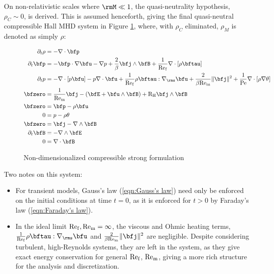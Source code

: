     On non-relativistic scales where $\rmM  \ll  1$, the quasi-neutrality hypothesis, $\rho_{C}  \sim  0$, is derived. This is assumed henceforth, giving the final quasi-neutral compressible Hall MHD system in Figure \ref{fig:non-dim compressible strong form}, where, with $\rho_{C}$ eliminated, $\rho_{M}$ is denoted as simply $\rho$:

    \begin{figure}[!ht]
        \centering
        \line
        \begin{align}
            \partial_{t}\rho  &=  - \nabla\cdot\bfp  \label{eqn:mass conservation}  \\
            \partial_{t}\bfp  &=  - \bfp\cdot\nabla\bfu - \nabla p + \frac{2}{\beta}\bfj\wedge\bfB + \frac{1}{\rmRef}\nabla\cdot[\rho\bftau]  \label{eqn:momentum conservation}  \\
            \partial_{t}p     &=  - \nabla\cdot[p\bfu] - p\nabla\cdot\bfu + \frac{1}{\rmRef}\rho\bftau:\nabla_{\rms}\bfu + \frac{2}{\beta\rmRem}\|\bfj\|^{2} + \frac{1}{\rmPe}\nabla\cdot[\rho\nabla\theta]  \label{eqn:energy conservation}  \\
            \bfzero           &=  \frac{1}{\rmRem}\bfj - \left(\bfE + \bfu\wedge\bfB\right) + \rmRH\bfj\wedge\bfB  \label{eqn:current identity}  \\
            \bfzero           &=  \bfp - \rho\bfu  \label{eqn:velocity identity}  \\
            0                 &=  p - \rho\theta  \label{eqn:temperature identity}  \\
            \bfzero           &=  \bfj - \nabla\wedge\bfB  \label{eqn:Ampère's law}  \\
            \partial_{t}\bfB  &=  - \nabla\wedge\bfE  \label{eqn:Faraday's law}  \\
            0                 &=  \nabla\cdot\bfB  \label{eqn:Gauss's law}
        \end{align}
        \line
        \caption{Non-dimensionalized compressible strong formulation}
        \label{fig:non-dim compressible strong form}
    \end{figure}

    Two notes on this system:
    \begin{itemize}
        \item  For transient models, Gauss's law (\ref{eqn:Gauss's law}) need only be enforced on the initial conditions at time $t  =  0$, as it is enforced for $t  >  0$ by Faraday's law (\ref{eqn:Faraday's law}).

        \item  In the ideal limit $\mathrm{Re}_{\mathrm{f}}, \mathrm{Re}_{\mathrm{m}}  =  \infty$, the viscous and Ohmic heating terms, $\frac{1}{\rmRef}\rho\bftau:\nabla_{\rms}\bfu$ and $\frac{2}{\beta\rmRem}\|\bfj\|^{2}$ are negligible. Despite considering turbulent, high-Reynolds systems, they are left in the system, as they give exact energy conservation for general $\mathrm{Re}_{\mathrm{f}}$, $\mathrm{Re}_{\mathrm{m}}$, giving a more rich structure for the analysis and discretization. 
    \end{itemize}

